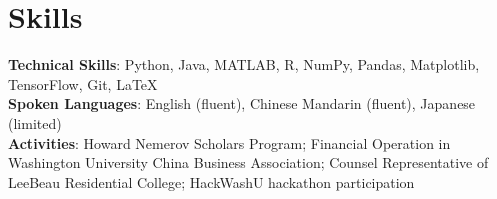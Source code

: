 \documentclass[letterpaper,11pt]{article}
\begin{document}
%
\section{Skills}
 \begin{itemize}[leftmargin=0.15in, label={}]
    \small{\item{
     \textbf{Technical Skills}{: Python, Java, MATLAB, R, NumPy, Pandas, Matplotlib,  TensorFlow, Git, LaTeX} \\
     \textbf{Spoken Languages}{: English (fluent), Chinese Mandarin (fluent), Japanese (limited)} \\
     \textbf{Activities}{: Howard Nemerov Scholars Program; Financial Operation in Washington University China Business Association; Counsel Representative of LeeBeau Residential College; HackWashU hackathon participation} \\
    }}
 \end{itemize}


\end{document}
